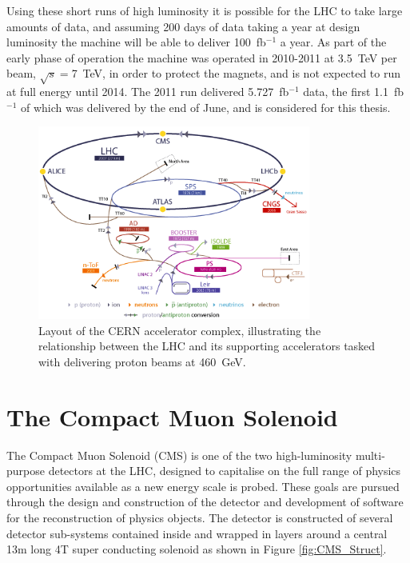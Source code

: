 Using these short runs of high luminosity it is possible for the LHC to take large amounts of data, and assuming 200 days of data taking a year  at design luminosity the machine will be able to deliver 100~fb$^{-1}$ a year. As part of the early phase of operation the machine was operated in 2010-2011 at 3.5~TeV per beam, $\sqrt{s} = $7~TeV, in order to protect the magnets, and is not expected to run at full energy until 2014. The 2011 run delivered 5.727~fb$^{-1}$ data, the first 1.1~fb$^{-1}$ of which was delivered by the end of June, and is considered for this thesis.

\begin{figure}[htbp]
\centering
\includegraphics[width=0.8\textwidth]{Figures/Detector/injection}
\caption{Layout of the CERN accelerator complex, illustrating the relationship between the LHC and its supporting accelerators tasked with delivering proton beams at 460~GeV.}
\label{fig:LHCinject}
\end{figure}



\section{The Compact Muon Solenoid}

The Compact Muon Solenoid (CMS) is one of the two high-luminosity multi-purpose detectors at the LHC, designed to capitalise on the full range of physics opportunities available as a new energy scale is probed. These goals are pursued through the design and construction of the detector and development of software for the reconstruction of physics objects. The detector is constructed of several detector sub-systems contained inside and wrapped in layers around a central 13m long 4T super conducting solenoid as shown in Figure \ref{fig:CMS_Struct}. 

